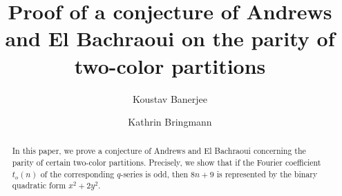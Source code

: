 \documentclass[12pt,reqno]{amsart}
\title{Proof of a conjecture of Andrews and El Bachraoui on the parity of two-color partitions}
\author{Koustav Banerjee}
\author{Kathrin Bringmann}
\renewcommand{\(}{\left\(}
\renewcommand{\)}{\right\)}
\numberwithin{equation}{section}
\theoremstyle{plain}
\theoremstyle{definition}
\numberwithin{equation}{section}
\begin{document}
	


\begin{abstract}

 In this paper, we prove a conjecture of Andrews and El Bachraoui concerning the parity of certain two-color partitions. Precisely, we show that if the Fourier coefficient $t_o(n)$ of the corresponding $q$-series is odd, then $8n+9$ is represented by the binary quadratic form $x^2+2y^2$. %
\end{abstract}

\maketitle
\end{document}
